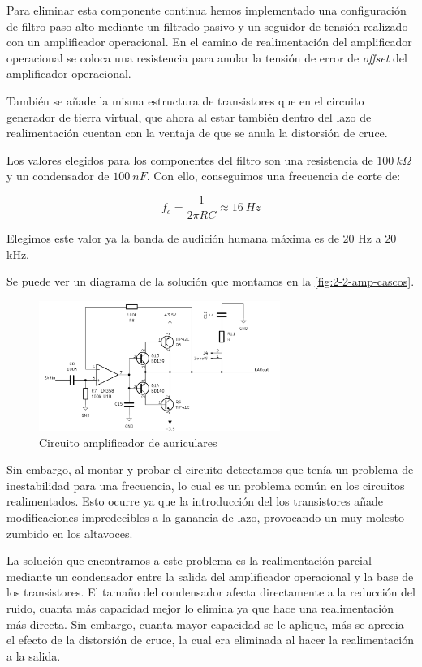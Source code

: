 Para eliminar esta componente continua hemos implementado una configuración de filtro paso alto mediante un filtrado pasivo y un seguidor de tensión realizado con un amplificador operacional. En el camino de realimentación del amplificador operacional se coloca una resistencia para anular la tensión de error de \textit{offset} del amplificador operacional.

También se añade la misma estructura de transistores que en el circuito generador de tierra virtual, que ahora al estar también dentro del lazo de realimentación cuentan con la ventaja de que se anula la distorsión de cruce. 

Los valores elegidos para los componentes del filtro son una resistencia de $100\ k\Omega$ y un condensador de $100\ nF$. Con ello, conseguimos una frecuencia de corte de:

\[
    f_c = \frac{1}{2\pi RC} \approx 16\ Hz    
\]

Elegimos este valor ya la banda de audición humana máxima es de $20$ Hz a $20$ kHz.

Se puede ver un diagrama de la solución que montamos en la \autoref{fig:2-2-amp-cascos}.

\begin{figure}[h]
    \centering
    \includegraphics[width=0.7\textwidth]{images/2/2-2/circuitoAmplificadorCascos.png}
    \caption{Circuito amplificador de auriculares}
    \label{fig:2-2-amp-cascos}
\end{figure}

Sin embargo, al montar y probar el circuito detectamos que tenía un problema de inestabilidad para una frecuencia, lo cual es un problema común en los circuitos realimentados. Esto ocurre ya que la introducción del los transistores añade modificaciones impredecibles a la ganancia de lazo, provocando un muy molesto zumbido en los altavoces.

La solución que encontramos a este problema es la realimentación parcial mediante un condensador entre la salida del amplificador operacional y la base de los transistores. El tamaño del condensador afecta directamente a la reducción del ruido, cuanta más capacidad mejor lo elimina ya que hace una realimentación más directa. Sin embargo, cuanta mayor capacidad se le aplique, más se aprecia el efecto de la distorsión de cruce, la cual era eliminada al hacer la realimentación a la salida.

